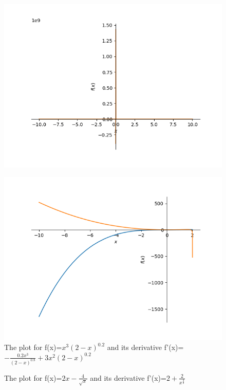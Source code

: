 \documentclass{article}
\begin{document}
\begin{figure}
\centering
\includegraphics{plot_10}
\end{figure}\begin{figure}
\caption{The plot for f(x)=$x^{3} \left(2 - x\right)^{0.2}$ and its derivative f'(x)=$- \frac{0.2 x^{3}}{\left(2 - x\right)^{0.8}} + 3 x^{2} \left(2 - x\right)^{0.2}$}
\centering
\includegraphics{plot_11}
\end{figure}\begin{figure}
\caption{The plot for f(x)=$2 x - \frac{4}{\sqrt{x}}$ and its derivative f'(x)=$2 + \frac{2}{x^{\frac{3}{2}}}$}
\centering

\end{figure}
\end{document}
